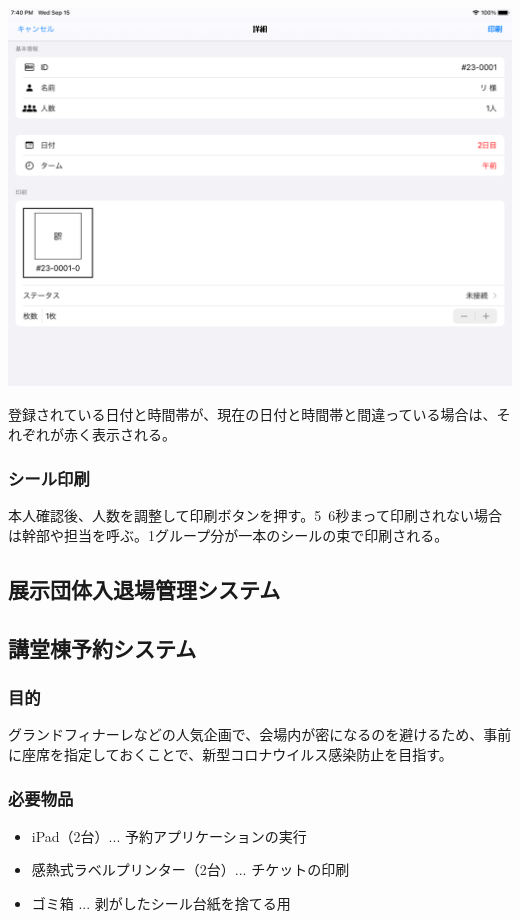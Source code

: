 \documentclass[dvipdfmx,jb5]{jarticle}
\begin{document}
\begin{enumerate}
   \includegraphics[scale=0.2]{assets/entrance-system.png}
 \end{enumerate}
    登録されている日付と時間帯が、現在の日付と時間帯と間違っている場合は、それぞれが赤く表示される。
 \subsubsection{シール印刷}
 本人確認後、人数を調整して印刷ボタンを押す。5~6秒まって印刷されない場合は幹部や担当を呼ぶ。1グループ分が一本のシールの束で印刷される。
\subsection{展示団体入退場管理システム}
\subsection{講堂棟予約システム}
 \subsubsection{目的}
 グランドフィナーレなどの人気企画で、会場内が密になるのを避けるため、事前に座席を指定しておくことで、新型コロナウイルス感染防止を目指す。
 \subsubsection{必要物品}
 \begin{itemize}
 \item iPad（2台）... 予約アプリケーションの実行
 \item 感熱式ラベルプリンター（2台）... チケットの印刷
 \item ゴミ箱 ... 剥がしたシール台紙を捨てる用
 \end{itemize}
\end{document}
